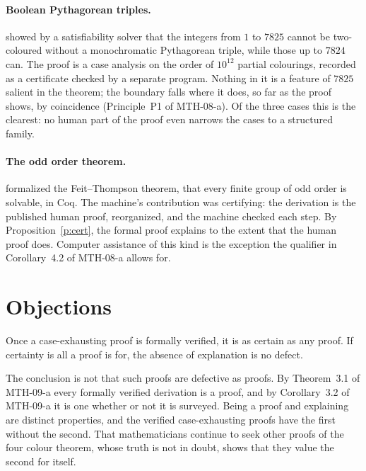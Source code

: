 \documentclass{situationist-preprint}
\begin{document}
\paragraph{Boolean Pythagorean triples.} \citet{HeuleEtAl2016} showed by a satisfiability solver that the integers from $1$ to $7825$ cannot be two-coloured without a monochromatic Pythagorean triple, while those up to $7824$ can. The proof is a case analysis on the order of $10^{12}$ partial colourings, recorded as a certificate checked by a separate program. Nothing in it is a feature of $7825$ salient in the theorem; the boundary falls where it does, so far as the proof shows, by coincidence (Principle~P1 of MTH-08-a). Of the three cases this is the clearest: no human part of the proof even narrows the cases to a structured family.

\paragraph{The odd order theorem.} \citet{GonthierEtAl2013} formalized the Feit--Thompson theorem, that every finite group of odd order is solvable, in Coq. The machine's contribution was certifying: the derivation is the published human proof, reorganized, and the machine checked each step. By Proposition~\ref{p:cert}, the formal proof explains to the extent that the human proof does. Computer assistance of this kind is the exception the qualifier in Corollary~4.2 of MTH-08-a allows for.

\section{Objections}

\begin{objection}
Once a case-exhausting proof is formally verified, it is as certain as any proof. If certainty is all a proof is for, the absence of explanation is no defect.
\end{objection}

\begin{reply}
The conclusion is not that such proofs are defective as proofs. By Theorem~3.1 of MTH-09-a every formally verified derivation is a proof, and by Corollary~3.2 of MTH-09-a it is one whether or not it is surveyed. Being a proof and explaining are distinct properties, and the verified case-exhausting proofs have the first without the second. That mathematicians continue to seek other proofs of the four colour theorem, whose truth is not in doubt, shows that they value the second for itself.
\end{reply}
\end{document}
